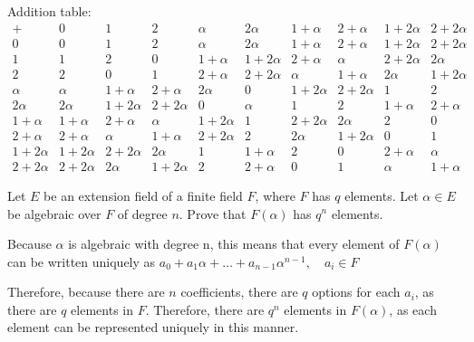 \documentclass{article}
\begin{document}
\begin{problem}[29.18]
\begin{solution}
        Addition table: 
        \[
            \begin{array}{c|ccccccccc}
                + & 0 & 1 & 2 & \alpha & 2\alpha & 1 + \alpha & 2 + \alpha & 1 + 2\alpha & 2 + 2\alpha \\ \hline
                0 & 0 & 1 & 2 & \alpha & 2\alpha & 1 + \alpha & 2 + \alpha & 1 + 2\alpha & 2 + 2\alpha\\
                1 & 1 & 2 & 0 & 1 + \alpha & 1 + 2\alpha & 2 + \alpha & \alpha & 2 + 2\alpha & 2\alpha \\
                2 & 2 & 0 & 1 & 2 + \alpha & 2 + 2\alpha & \alpha & 1 + \alpha & 2\alpha & 1 + 2\alpha\\
                \alpha & \alpha & 1 + \alpha & 2 + \alpha & 2\alpha & 0 & 1 + 2\alpha & 2 + 2\alpha & 1 & 2\\
                2\alpha & 2\alpha & 1 + 2\alpha & 2 + 2\alpha & 0 & \alpha & 1 & 2 & 1 + \alpha & 2 + \alpha\\
                1 + \alpha & 1 + \alpha & 2 + \alpha & \alpha & 1 + 2 \alpha & 1 & 2 + 2 \alpha & 2\alpha & 2 & 0\\
                2 + \alpha & 2 + \alpha & \alpha & 1 + \alpha & 2 + 2\alpha & 2 & 2\alpha & 1 + 2\alpha & 0 & 1\\
                1 + 2\alpha & 1 + 2\alpha & 2 +2\alpha & 2\alpha & 1 & 1 + \alpha & 2 & 0 & 2 + \alpha & \alpha\\
                2 + 2\alpha & 2 + 2\alpha & 2\alpha & 1 + 2\alpha & 2 & 2 + \alpha & 0 & 1 & \alpha & 1 + \alpha 

            \end{array}
            \]
    \end{solution}
\end{problem}
\vspace{\baselineskip}
\vspace{\baselineskip}
\begin{problem}[29.30]
    Let $E$ be an extension field of a finite field $F$, where $F$ has $q$ elements. Let $\alpha \in E$ be algebraic over $F$ of degree $n$. Prove that $F(\alpha)$ has $q^n$ elements.
\end{problem}
\begin{solution}
    Because $\alpha$ is algebraic with degree n, this means that every element of $F(\alpha)$ can be written uniquely as $a_0 + a_1 \alpha + \dots + a_{n-1}\alpha^{n-1}, \quad a_i \in F$

    Therefore, because there are $n$ coefficients, there are $q$ options for each $a_i$, as there are $q$ elements in $F$. Therefore, there are $q^n$ elements in $F(\alpha)$, as each element can be represented uniquely in this manner. 
\end{solution}
\end{document}
